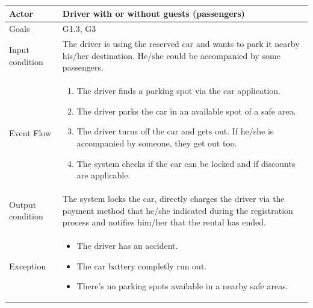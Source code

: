 \begin{table}[H]
	\begin{center}
		\begin{tabular}{| l | p{} |}
			\hline
			Actor & Driver with or without guests (passengers) \\
			\hline
			Goals & G1.3, G3
			\\
			\hline
			Input condition & The driver is using the reserved car and wants to park it nearby his/her destination. He/she could be accompanied by some passengers. \\
			\hline
			Event Flow & \begin{enumerate}
				\item The driver finds a parking spot via the car application.
				\item The driver parks the car in an available spot of a safe area.
				\item The driver turns off the car and gets out. If he/she is accompanied by someone, they get out too.
				\item The system checks if the car can be locked and if discounts are applicable. 
			\end{enumerate}
			\\
			\hline
			Output condition & The system locks the car, directly charges the driver via the payment method that he/she indicated during the registration process and notifies him/her that the rental has ended.\\
			\hline
			
			Exception &  \begin{itemize}
				\item The driver has an accident.
				\item The car battery completly run out.	
				\item There's no parking spots available in a nearby safe areas.	
			\end{itemize}
			\\
			\hline
		\end{tabular}
	\end{center}
\end{table}

